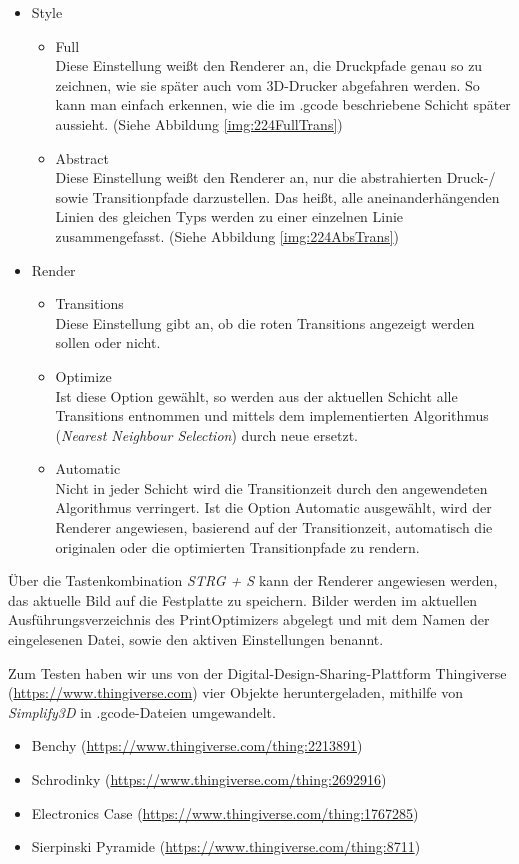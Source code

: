 \documentclass[12pt, a4paper]{article}
\begin{document}
\begin{itemize}
  \item Style
  \begin{itemize}
  	\item Full \\
    Diese Einstellung weißt den Renderer an, die Druckpfade genau so zu zeichnen, wie sie später auch vom 3D-Drucker abgefahren werden. So kann man einfach erkennen, wie die im .gcode beschriebene Schicht später aussieht. (Siehe Abbildung \ref{img:224FullTrans})
  	\item Abstract \\
    Diese Einstellung weißt den Renderer an, nur die abstrahierten Druck-/ sowie Transitionpfade darzustellen. Das heißt, alle aneinanderhängenden Linien des gleichen Typs werden zu einer einzelnen Linie zusammengefasst. (Siehe Abbildung \ref{img:224AbsTrans})
  \end{itemize}
  \item Render
  \begin{itemize}
  	\item Transitions \\
    Diese Einstellung gibt an, ob die roten Transitions angezeigt werden sollen oder nicht.
  	\item Optimize \\
    Ist diese Option gewählt, so werden aus der aktuellen Schicht alle Transitions entnommen und mittels dem implementierten Algorithmus (\textit{Nearest Neighbour Selection}) durch neue ersetzt.
  	\item Automatic \\
    Nicht in jeder Schicht wird die Transitionzeit durch den angewendeten Algorithmus verringert. Ist die Option Automatic ausgewählt, wird der Renderer angewiesen, basierend auf der Transitionzeit, automatisch die originalen oder die optimierten Transitionpfade zu rendern.
  \end{itemize}
\end{itemize}
Über die Tastenkombination \textit{STRG + S} kann der Renderer angewiesen werden, das aktuelle Bild auf die Festplatte zu speichern. Bilder werden im aktuellen Ausführungsverzeichnis des PrintOptimizers abgelegt und mit dem Namen der eingelesenen Datei, sowie den aktiven Einstellungen benannt.

\begin{samepage}
Zum Testen haben wir uns von der Digital-Design-Sharing-Plattform Thingiverse (\url{https://www.thingiverse.com}) vier Objekte heruntergeladen, mithilfe von \textit{Simplify3D} in .gcode-Dateien umgewandelt.
\begin{itemize}
\item Benchy (\url{https://www.thingiverse.com/thing:2213891})
\item Schrodinky (\url{https://www.thingiverse.com/thing:2692916})
\item Electronics Case (\url{https://www.thingiverse.com/thing:1767285})
\item Sierpinski Pyramide (\url{https://www.thingiverse.com/thing:8711})
\end{itemize}
\end{samepage}
\end{document}
